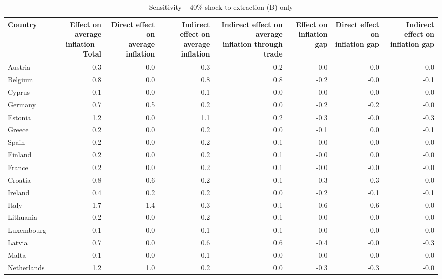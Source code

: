 \documentclass[11pt]{article}
\begin{document}
\setcounter{table}{3}
\begin{table}[H]
\centering
\caption{Sensitivity -- 40\% shock to extraction (B) only}
\scriptsize
\setlength{\tabcolsep}{1.2pt}
\begin{tabular}{lrrrrrrr}
\toprule
Country & \shortstack{Effect on average\\inflation -- Total} & \shortstack{Direct effect on\\average inflation} & \shortstack{Indirect effect on\\average inflation} & \shortstack{Indirect effect on average\\inflation through trade} & \shortstack{Effect on\\inflation gap} & \shortstack{Direct effect on\\inflation gap} & \shortstack{Indirect effect on\\inflation gap}
 \\
\midrule
Austria & 0.3 & 0.0 & 0.3 & 0.2 & -0.0 & -0.0 & -0.0
 \\
Belgium & 0.8 & 0.0 & 0.8 & 0.8 & -0.2 & -0.0 & -0.1
 \\
Cyprus & 0.1 & 0.0 & 0.1 & 0.0 & -0.0 & -0.0 & -0.0
 \\
Germany & 0.7 & 0.5 & 0.2 & 0.0 & -0.2 & -0.2 & -0.0
 \\
Estonia & 1.2 & 0.0 & 1.1 & 0.2 & -0.3 & -0.0 & -0.3
 \\
Greece & 0.2 & 0.0 & 0.2 & 0.0 & -0.1 & 0.0 & -0.1
 \\
Spain & 0.2 & 0.0 & 0.2 & 0.1 & -0.0 & -0.0 & -0.0
 \\
Finland & 0.2 & 0.0 & 0.2 & 0.1 & -0.0 & 0.0 & -0.0
 \\
France & 0.2 & 0.0 & 0.2 & 0.1 & -0.0 & -0.0 & -0.0
 \\
Croatia & 0.8 & 0.6 & 0.2 & 0.1 & -0.3 & -0.3 & -0.0
 \\
Ireland & 0.4 & 0.2 & 0.2 & 0.0 & -0.2 & -0.1 & -0.1
 \\
Italy & 1.7 & 1.4 & 0.3 & 0.1 & -0.6 & -0.6 & -0.0
 \\
Lithuania & 0.2 & 0.0 & 0.2 & 0.1 & -0.0 & -0.0 & -0.0
 \\
Luxembourg & 0.1 & 0.0 & 0.1 & 0.1 & -0.0 & -0.0 & -0.0
 \\
Latvia & 0.7 & 0.0 & 0.6 & 0.6 & -0.4 & -0.0 & -0.3
 \\
Malta & 0.1 & 0.0 & 0.1 & 0.0 & 0.0 & -0.0 & 0.0
 \\
Netherlands & 1.2 & 1.0 & 0.2 & 0.0 & -0.3 & -0.3 & -0.0
 \\

\end{tabular}
\end{table}
\end{document}
